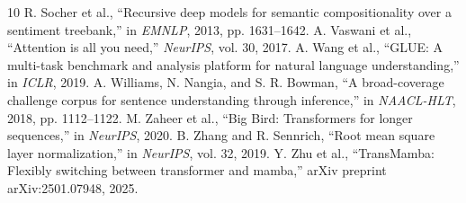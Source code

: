 \documentclass[10pt, conference]{IEEEtran}
\begin{document}
\begin{thebibliography}{10}
 R. Socher et al., ``Recursive deep models for semantic compositionality over a sentiment treebank,'' in \textit{EMNLP}, 2013, pp. 1631--1642. %
 A. Vaswani et al., ``Attention is all you need,'' \textit{NeurIPS}, vol. 30, 2017. %
 A. Wang et al., ``GLUE: A multi-task benchmark and analysis platform for natural language understanding,'' in \textit{ICLR}, 2019. %
 A. Williams, N. Nangia, and S. R. Bowman, ``A broad-coverage challenge corpus for sentence understanding through inference,'' in \textit{NAACL-HLT}, 2018, pp. 1112--1122. %
 M. Zaheer et al., ``Big Bird: Transformers for longer sequences,'' in \textit{NeurIPS}, 2020. %
 B. Zhang and R. Sennrich, ``Root mean square layer normalization,'' in \textit{NeurIPS}, vol. 32, 2019. %
 Y. Zhu et al., ``TransMamba: Flexibly switching between transformer and mamba,'' arXiv preprint arXiv:2501.07948, 2025. %
\end{thebibliography}
\end{document}

